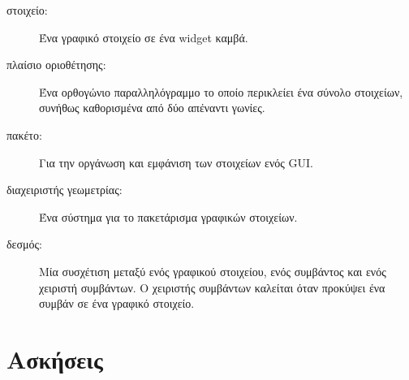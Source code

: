 \documentclass[10pt]{book}
\begin{document}
\begin{description}
\item[στοιχείο:] Ένα γραφικό στοιχείο σε ένα  widget  καμβά.

\item[πλαίσιο οριοθέτησης:] Ένα ορθογώνιο παραλληλόγραμμο το οποίο περικλείει ένα σύνολο 
στοιχείων, συνήθως καθορισμένα από δύο απέναντι γωνίες.

\item[πακέτο:] Για την οργάνωση και εμφάνιση των στοιχείων ενός  GUI. 

\item[διαχειριστής γεωμετρίας:] Ένα σύστημα για το πακετάρισμα γραφικών στοιχείων.

\item[δεσμός:] Μία συσχέτιση μεταξύ ενός γραφικού στοιχείου, ενός συμβάντος και ενός χειριστή συμβάντων.  Ο χειριστής συμβάντων καλείται όταν προκύψει ένα συμβάν σε ένα γραφικό στοιχείο.

\end{description}


\section{Ασκήσεις}
\end{document}
